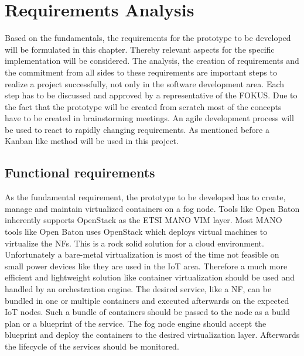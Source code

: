 \chapter{Requirements Analysis}
\label{chapter:requirements-analysis}
\minitoc\vspace{.5cm}
Based on the fundamentals, the requirements for the prototype to be developed will be formulated in this chapter.
Thereby relevant aspects for the specific implementation will be considered.
The analysis, the creation of requirements and the commitment from all sides to these requirements are important steps to realize a project successfully, not only in the software development area.
Each step has to be discussed and approved by a representative of the \ac{FOKUS}.
Due to the fact that the prototype will be created from scratch most of the concepts have to be created in brainstorming meetings.
An agile development process will be used to react to rapidly changing requirements.
As mentioned before a Kanban like method will be used in this project.


\section{Functional requirements}
\label{section:functional-requirements}
As the fundamental requirement, the prototype to be developed has to create, manage and maintain virtualized containers on a fog node.
Tools like Open Baton inherently supports OpenStack as the \ac{ETSI} \ac{MANO} \ac{VIM} layer.
Most \ac{MANO} tools like Open Baton uses OpenStack which deploys virtual machines to virtualize the \acp{NF}.
This is a rock solid solution for a cloud environment.
Unfortunately a bare-metal virtualization is most of the time not feasible on small power devices like they are used in the \ac{IoT} area.
Therefore a much more efficient and lightweight solution like container virtualization should be used and handled by an orchestration engine.
The desired service, like a \ac{NF}, can be bundled in one or multiple containers and executed afterwards on the expected \ac{IoT} nodes.
Such a bundle of containers should be passed to the node as a build plan or a blueprint of the service.
The fog node engine should accept the blueprint and deploy the containers to the desired virtualization layer.
Afterwards the lifecycle of the services should be monitored.

